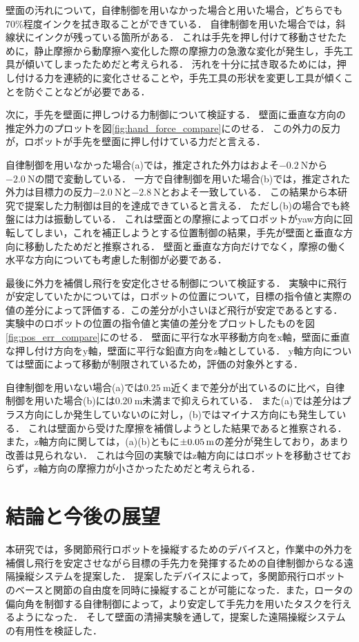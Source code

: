 \documentclass{jarticle}
\begin{document}
壁面の汚れについて，自律制御を用いなかった場合と用いた場合，どちらでも70\%程度インクを拭き取ることができている．
自律制御を用いた場合では，斜線状にインクが残っている箇所がある．
これは手先を押し付けて移動させたために，静止摩擦から動摩擦へ変化した際の摩擦力の急激な変化が発生し，手先工具が傾いてしまったためだと考えられる．
汚れを十分に拭き取るためには，押し付ける力を連続的に変化させることや，手先工具の形状を変更し工具が傾くことを防ぐことなどが必要である．

次に，手先を壁面に押しつける力制御について検証する．
壁面に垂直な方向の推定外力のプロットを図\ref{fig:hand_force_compare}にのせる．
この外力の反力が，ロボットが手先を壁面に押し付けている力だと言える．

自律制御を用いなかった場合(a)では，推定された外力はおよそ$\SI{-0.2}{\newton}$から$\SI{-2.0}{\newton}$の間で変動している．
一方で自律制御を用いた場合(b)では，推定された外力は目標力の反力$\SI{-2.0}{\newton}$と$\SI{-2.8}{\newton}$とおよそ一致している．
この結果から本研究で提案した力制御は目的を達成できていると言える．
ただし(b)の場合でも終盤には力は振動している．
これは壁面との摩擦によってロボットがyaw方向に回転してしまい，これを補正しようとする位置制御の結果，手先が壁面と垂直な方向に移動したためだと推察される．
壁面と垂直な方向だけでなく，摩擦の働く水平な方向についても考慮した制御が必要である．

最後に外力を補償し飛行を安定化させる制御について検証する．
実験中に飛行が安定していたかについては，ロボットの位置について，目標の指令値と実際の値の差分によって評価する．この差分が小さいほど飛行が安定であるとする．
実験中のロボットの位置の指令値と実値の差分をプロットしたものを図\ref{fig:pos_err_compare}にのせる．
壁面に平行な水平移動方向をx軸，壁面に垂直な押し付け方向をy軸，壁面に平行な鉛直方向をz軸としている．
y軸方向については壁面によって移動が制限されているため，評価の対象外とする．

自律制御を用いない場合(a)では$\SI{+0.25}{\meter}$近くまで差分が出ているのに比べ，自律制御を用いた場合(b)には$\SI{+0.20}{\meter}$未満まで抑えられている．
また(a)では差分はプラス方向にしか発生していないのに対し，(b)ではマイナス方向にも発生している．
これは壁面から受けた摩擦を補償しようとした結果であると推察される．
また，z軸方向に関しては，(a)(b)ともに$\SI{\pm0.05}{\meter}$の差分が発生しており，あまり改善は見られない．
これは今回の実験ではz軸方向にはロボットを移動させておらず，z軸方向の摩擦力が小さかったためだと考えられる．

\section{結論と今後の展望}
本研究では，多関節飛行ロボットを操縦するためのデバイスと，作業中の外力を補償し飛行を安定させながら目標の手先力を発揮するための自律制御からなる遠隔操縦システムを提案した．
提案したデバイスによって，多関節飛行ロボットのベースと関節の自由度を同時に操縦することが可能になった．また，ロータの偏向角を制御する自律制御によって，より安定して手先力を用いたタスクを行えるようになった．
そして壁面の清掃実験を通して，提案した遠隔操縦システムの有用性を検証した．
\end{document}
